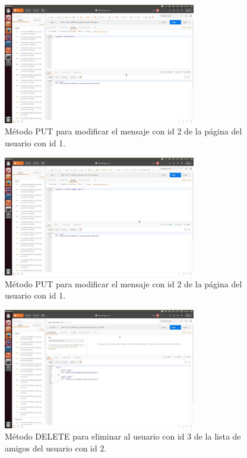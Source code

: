 \documentclass[12pt,a4paper, spanish]{article}
\begin{document}
\begin{figure}[H]
	\centering
	\includegraphics[width=0.75\textwidth]{images/captura16.jpg}
	\caption{Método PUT para modificar el mensaje con id 2 de la página del usuario con id 1.}
\end{figure}

\begin{figure}[H]
	\centering
	\includegraphics[width=0.75\textwidth]{images/captura17.jpg}
	\caption{Método PUT para modificar el mensaje con id 2 de la página del usuario con id 1.}
\end{figure}

\begin{figure}[H]
	\centering
	\includegraphics[width=0.75\textwidth]{images/captura18.jpg}
	\caption{Método DELETE para eliminar al usuario con id 3 de la lista de amigos del usuario con id 2.}
\end{figure}
\end{document}
